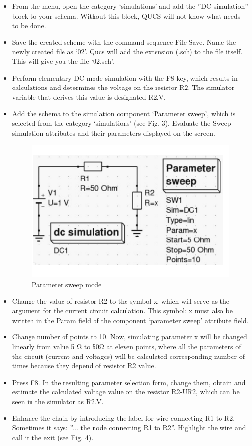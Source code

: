 \documentclass{report}
\begin{document}
	\begin{itemize}
		\item From the menu, open the category ‘simulations’ and add the ”DC simulation” block to
		your schema. Without this block, QUCS will not know what needs to be done.
		\item Save the created scheme with the command sequence File-Save. Name the newly created
		file as ‘02’. Qucs will add the extension (.sch) to the file itself. This will give you the
		file ‘02.sch’.
		
		\item Perform elementary DC mode simulation with the F8 key, which results in calculations
		and determines the voltage on the resistor R2. The simulator variable that derives this
		value is designated R2.V.
		\item Add the schema to the simulation component ‘Parameter sweep’, which is selected from
		the category ‘simulations’ (see Fig. 3). Evaluate the Sweep simulation attributes and
		their parameters displayed on the screen. \cite{firstRef,thirdRef}
		
		
		\begin{figure}[t]
			\includegraphics{Figures/Figu}
			\caption{Parameter sweep mode}
			\label{fig:figure3}
		\end{figure}
		
		
		\item Change the value of resistor R2 to the symbol x, which will serve as the argument for the
		current circuit calculation. This symbol: x must also be written in the Param field of the
		component ‘parameter sweep’ attribute field.
		\item Change number of points to 10. Now, simulating parameter x will be changed linearly
		from value 5 Ω to 50Ω at eleven points, where all the parameters of the circuit (current
		and voltages) will be calculated corresponding number of times because they depend of
		resistor R2 value.
		\item Press F8. In the resulting parameter selection form, change them, obtain and estimate
		the calculated voltage value on the resistor R2-UR2, which can be seen in the simulator
		as R2.V.
		\item Enhance the chain by introducing the label for wire connecting R1 to R2. Sometimes it
		says: ”... the node connecting R1 to R2”. Highlight the wire and call it the exit (see Fig. 4). \cite{firstRef}
		

\end{itemize}
\end{document}
